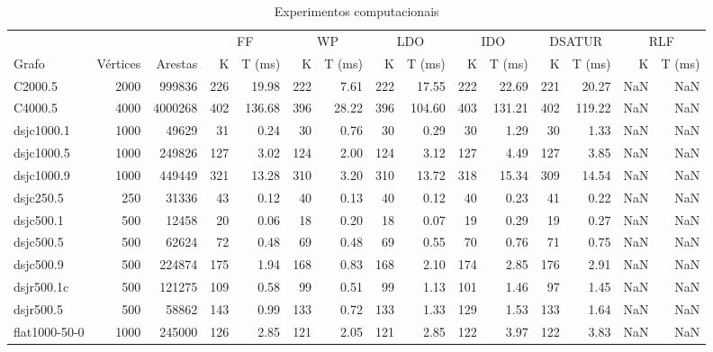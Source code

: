 \begin{table*}
    \caption{Experimentos computacionais}
    \begin{adjustbox}{width=\textwidth}%
    \small
    \centering
    \begin{minipage}[b]{\textwidth}
        \centering
\begin{tabular}{@{} lrrrrrrrrrrrrrr @{}}
\toprule
& & & \multicolumn{2}{c}{FF} & \multicolumn{2}{c}{WP} & \multicolumn{2}{c}{LDO} & \multicolumn{2}{c}{IDO} & \multicolumn{2}{c}{DSATUR} & \multicolumn{2}{c}{RLF}\\
\cmidrule(lr){4-5}\cmidrule(lr){6-7}\cmidrule(lr){8-9}\cmidrule(lr){10-11}\cmidrule(lr){12-13}\cmidrule(lr){14-15}
Grafo & Vértices & Arestas & K & T (ms) & K & T (ms) & K & T (ms) & K & T (ms) & K & T (ms) & K & T (ms) \\
\midrule
C2000.5 & 2000 & 999836 & 226 & 19.98 & 222 & 7.61 & 222 & 17.55 & 222 & 22.69 & 221 & 20.27 & NaN & NaN \\
C4000.5 & 4000 & 4000268 & 402 & 136.68 & 396 & 28.22 & 396 & 104.60 & 403 & 131.21 & 402 & 119.22 & NaN & NaN \\
dsjc1000.1 & 1000 & 49629 & 31 & 0.24 & 30 & 0.76 & 30 & 0.29 & 30 & 1.29 & 30 & 1.33 & NaN & NaN \\
dsjc1000.5 & 1000 & 249826 & 127 & 3.02 & 124 & 2.00 & 124 & 3.12 & 127 & 4.49 & 127 & 3.85 & NaN & NaN \\
dsjc1000.9 & 1000 & 449449 & 321 & 13.28 & 310 & 3.20 & 310 & 13.72 & 318 & 15.34 & 309 & 14.54 & NaN & NaN \\
dsjc250.5 & 250 & 31336 & 43 & 0.12 & 40 & 0.13 & 40 & 0.12 & 40 & 0.23 & 41 & 0.22 & NaN & NaN \\
dsjc500.1 & 500 & 12458 & 20 & 0.06 & 18 & 0.20 & 18 & 0.07 & 19 & 0.29 & 19 & 0.27 & NaN & NaN \\
dsjc500.5 & 500 & 62624 & 72 & 0.48 & 69 & 0.48 & 69 & 0.55 & 70 & 0.76 & 71 & 0.75 & NaN & NaN \\
dsjc500.9 & 500 & 224874 & 175 & 1.94 & 168 & 0.83 & 168 & 2.10 & 174 & 2.85 & 176 & 2.91 & NaN & NaN \\
dsjr500.1c & 500 & 121275 & 109 & 0.58 & 99 & 0.51 & 99 & 1.13 & 101 & 1.46 & 97 & 1.45 & NaN & NaN \\
dsjr500.5 & 500 & 58862 & 143 & 0.99 & 133 & 0.72 & 133 & 1.33 & 129 & 1.53 & 133 & 1.64 & NaN & NaN \\
flat1000-50-0 & 1000 & 245000 & 126 & 2.85 & 121 & 2.05 & 121 & 2.85 & 122 & 3.97 & 122 & 3.83 & NaN & NaN \\

\end{tabular}
\end{minipage}
\end{adjustbox}
\end{table*}
